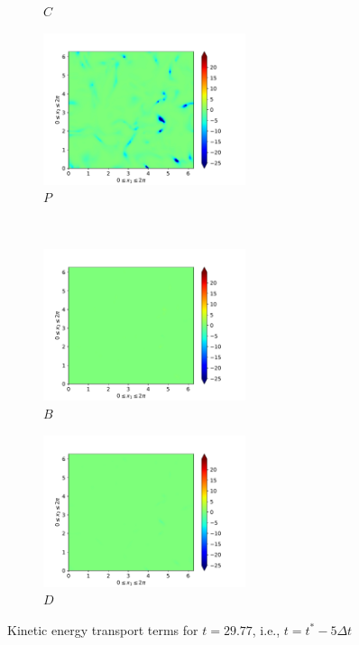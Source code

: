 \begin{figure}[H]
\begin{subfigure}{0.45\textwidth}
        \caption{$C$}
    \end{subfigure}
    \newline
    \begin{subfigure}{0.45\textwidth}
        \includegraphics[height=1.75in]{media/run-cds-65/P-ke-1335}
        \caption{$P$}
    \end{subfigure}
    ~
    \begin{subfigure}{0.45\textwidth}
        \includegraphics[height=1.75in]{media/run-cds-65/B-ke-1335}
        \caption{$B$}
    \end{subfigure}
    \newline
    \begin{subfigure}{0.45\textwidth}
        \includegraphics[height=1.75in]{media/run-cds-65/D-ke-1335}
        \caption{$D$}
    \end{subfigure}
    \caption{Kinetic energy transport terms for $t=29.77$, i.e., $t=t^{\ast} - 5 \Delta t$}
\end{figure}

\newpage

